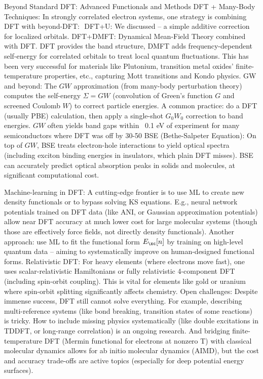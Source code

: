 \begin{frame}{Beyond Standard DFT: Advanced Functionals and Methods}
DFT + Many-Body Techniques: In strongly correlated electron systems, one strategy is combining DFT with beyond-DFT: 
DFT+U: We discussed – a simple additive correction for localized orbitals.
DFT+DMFT: Dynamical Mean-Field Theory combined with DFT. DFT provides the band structure, DMFT adds frequency-dependent self-energy for correlated orbitals to treat local quantum fluctuations. This has been very successful for materials like Plutonium, transition metal oxides’ finite-temperature properties, etc., capturing Mott transitions and Kondo physics.
GW and beyond: The $GW$ approximation (from many-body perturbation theory) computes the self-energy $\Sigma = G W$ (convolution of Green’s function $G$ and screened Coulomb $W$) to correct particle energies. A common practice: do a DFT (usually PBE) calculation, then apply a single-shot $G_0W_0$ correction to band energies. $GW$ often yields band gaps within ~0.1 eV of experiment for many semiconductors where DFT was off by 30-50%
BSE (Bethe-Salpeter Equation): On top of $GW$, BSE treats electron-hole interactions to yield optical spectra (including exciton binding energies in insulators, which plain DFT misses). BSE can accurately predict optical absorption peaks in solids and molecules, at significant computational cost.

Machine-learning in DFT: A cutting-edge frontier is to use ML to create new density functionals or to bypass solving KS equations. E.g., neural network potentials trained on DFT data (like ANI, or Gaussian approximation potentials) allow near DFT accuracy at much lower cost for large molecular systems (though those are effectively force fields, not directly density functionals). Another approach: use ML to fit the functional form $E_{\xc}[n]$ by training on high-level quantum data – aiming to systematically improve on human-designed functional forms.
Relativistic DFT: For heavy elements (where electrons move fast), one uses  scalar-relativistic Hamiltonians or fully relativistic 4-component DFT (including spin-orbit coupling). This is vital for elements like gold or uranium where spin-orbit splitting significantly affects chemistry.
Open challenges: Despite immense success, DFT still cannot solve everything. For example, describing multi-reference systems (like bond breaking, transition states of some reactions) is tricky. How to include missing physics systematically (like double excitations in TDDFT, or long-range correlation) is an ongoing research. And bridging finite-temperature DFT (Mermin functional for electrons at nonzero T) with classical molecular dynamics allows for ab initio molecular dynamics (AIMD), but the cost and accuracy trade-offs are active topics (especially for deep potential energy surfaces). \end{frame}


